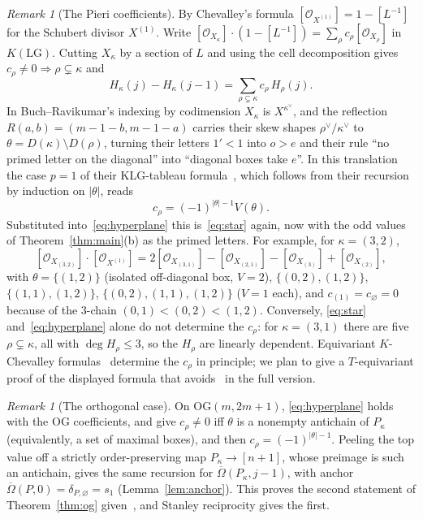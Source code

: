 \documentclass[submission]{FPSAC2027}
\theoremstyle{definition}
\theoremstyle{remark}
\newtheorem{remark}[theorem]{Remark}
\newcommand{\LG}{\mathrm{LG}}
\newcommand{\OG}{\mathrm{OG}}
\newcommand{\cO}{\mathcal{O}}
\newcommand{\Omb}{\overline{\Omega}}
\begin{document}
\begin{remark}[The Pieri coefficients]\label{rem:pieri}
By Chevalley's formula $[\cO_{X^{(1)}}]=1-[L^{-1}]$ for the Schubert divisor $X^{(1)}$. Write
$[\cO_{X_\kappa}]\cdot(1-[L^{-1}])=\sum_\rho c_\rho[\cO_{X_\rho}]$ in $K(\LG)$. Cutting $X_\kappa$
by a section of $L$ and using the cell decomposition gives $c_\rho\ne0\Rightarrow\rho\subsetneq\kappa$
and
\begin{equation}\label{eq:hyperplane}
H_\kappa(j)-H_\kappa(j-1)=\sum_{\rho\subsetneq\kappa}c_\rho\,H_\rho(j).
\end{equation}
In Buch--Ravikumar's indexing by codimension $X_\kappa$ is $X^{\kappa^\vee}$, and the reflection
$R(a,b)=(m-1-b,m-1-a)$ carries their skew shapes $\rho^\vee/\kappa^\vee$ to
$\theta=D(\kappa)\setminus D(\rho)$, turning their letters $1'<1$ into $o>e$ and their rule ``no
primed letter on the diagonal'' into ``diagonal boxes take $e$''. In this translation the case
$p=1$ of their KLG-tableau formula~\cite[Cor.~5.6]{BR12}, which follows from their recursion
\cite[Cor.~5.4, Thm.~5.5]{BR12} by induction on $|\theta|$, reads
\[ c_\rho=(-1)^{|\theta|-1}V(\theta). \]
Substituted into~\eqref{eq:hyperplane} this is~\eqref{eq:star} again, now with the odd values of
Theorem~\ref{thm:main}(b) as the primed letters. For example, for $\kappa=(3,2)$,
\[ [\cO_{X_{(3,2)}}]\cdot[\cO_{X^{(1)}}]=2[\cO_{X_{(3,1)}}]-[\cO_{X_{(2,1)}}]-[\cO_{X_{(3)}}]+[\cO_{X_{(2)}}], \]
with $\theta=\{(1,2)\}$ (isolated off-diagonal box, $V=2$), $\{(0,2),(1,2)\}$, $\{(1,1),(1,2)\}$,
$\{(0,2),(1,1),(1,2)\}$ ($V=1$ each), and $c_{(1)}=c_\varnothing=0$ because of the $3$-chain
$(0,1)<(0,2)<(1,2)$. Conversely, \eqref{eq:star} and~\eqref{eq:hyperplane} alone do not
determine the $c_\rho$: for $\kappa=(3,1)$ there are five $\rho\subsetneq\kappa$, all with
$\deg H_\rho\le3$, so the $H_\rho$ are linearly dependent. Equivariant $K$-Chevalley
formulas~\cite{LS12} determine the $c_\rho$ in principle; we plan to give a $T$-equivariant proof
of the displayed formula that avoids~\cite{BR12} in the full version.
\end{remark}

\begin{remark}[The orthogonal case]\label{rem:og-k}
On $\OG(m,2m+1)$, \eqref{eq:hyperplane} holds with the $\OG$ coefficients, and
\cite[Cor.~4.4, Lemma~4.5]{BR12} give $c_\rho\ne0$ iff $\theta$ is a nonempty antichain of $P_\kappa$
(equivalently, a set of maximal boxes), and then $c_\rho=(-1)^{|\theta|-1}$. Peeling the top value
off a strictly order-preserving map $P_\kappa\to[n+1]$, whose preimage is such an antichain, gives the same
recursion for $\Omb(P_\kappa,j-1)$, with anchor $\Omb(P,0)=\delta_{P,\varnothing}=s_1$
(Lemma~\ref{lem:anchor}). This proves the second statement of Theorem~\ref{thm:og} given~\cite{BR12},
and Stanley reciprocity gives the first.
\end{remark}
\end{document}
